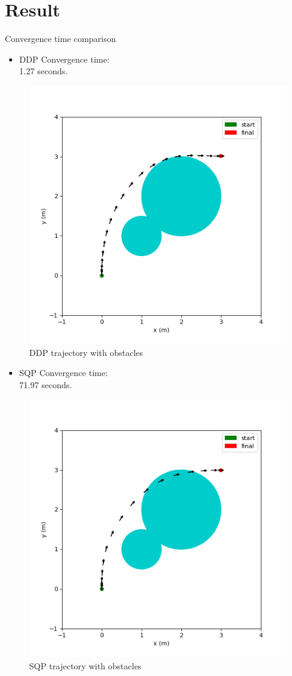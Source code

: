 \documentclass[10pt,compress]{beamer}
\begin{document}
\section{Result}

\begin{frame}{Convergence time comparison}

\begin{minipage}[t]{0.45\linewidth}
    \begin{itemize}
        \item {DDP Convergence time: \\ 1.27 seconds. }
    \end{itemize}
    \begin{figure}[h]
        \includegraphics[width=5 cm]{./images/with_obstacles.png}
        \centering
        \caption{DDP trajectory with obstacles}
    \end{figure}
\end{minipage} \hspace{1cm}
\begin{minipage}[t]{0.45\linewidth}
    \begin{itemize}
        \item {SQP Convergence time: \\ 71.97 seconds.} 
    \end{itemize}
    \begin{figure}[h]
        \includegraphics[width=5 cm]{./images/sqp_T5_constrained.png}
        \centering
        \caption{SQP trajectory with obstacles}
    \end{figure}
\end{minipage}

\end{frame}
\end{document}

